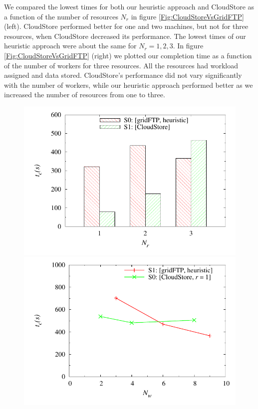 \documentclass{rspublic}
\begin{document}
We compared the lowest times for both our heuristic approach and
CloudStore as a function of the number of resources $N_r$ in figure
\ref{Fig:CloudStoreVsGridFTP} (left). CloudStore performed better for one and
two machines, but not for three resources, when CloudStore decreased its
performance. The lowest times of our heuristic approach were about the
same for $N_r=1,2,3$. In figure \ref{Fig:CloudStoreVsGridFTP} (right) we
plotted our completion time as a function of the number of workers for
three resources. All the resources had workload assigned and data
stored. CloudStore's performance did not vary significantly with the
number of workers, while our heuristic approach performed better as we
increased the number of resources from one to three.

\begin{figure}
\begin{center}
\subfigure
{
\includegraphics[scale=0.48]{data/graphs/NumberResourcesFigure_histogram}
\label{Fig:CloudStoreVsGridFTP:a}
}
\subfigure
{
\includegraphics[scale=0.48]{data/graphs/CloudStoreVsGridFTPFigure}
}
\end{center}
\end{figure}
\end{document}
